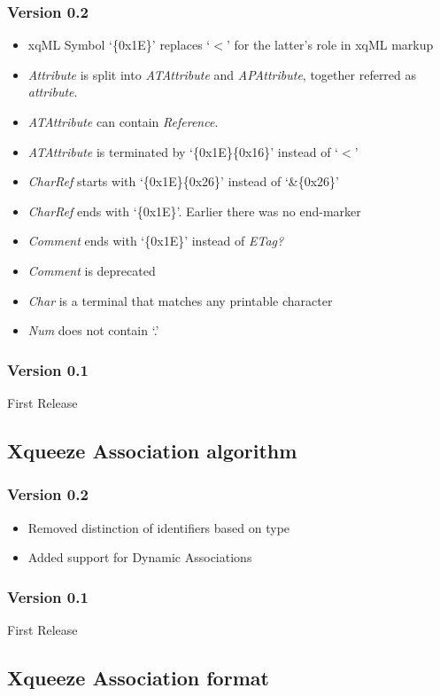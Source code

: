 \documentclass[a4paper]{article}
\begin{document}
\subsubsection{Version 0.2}
\begin{itemize}
\item xqML Symbol `\{0x1E\}' replaces `$<$' for the latter's role in
  xqML markup
\item \textit{Attribute} is split into \textit{ATAttribute} and
  \textit{APAttribute}, together referred as \textit{attribute}.
\item \textit{ATAttribute} can contain \textit{Reference}.
\item \textit{ATAttribute} is terminated by `\{0x1E\}\{0x16\}' instead of
  `$<$'
\item \textit{CharRef} starts with `\{0x1E\}\{0x26\}' instead of
  `\&\{0x26\}'
\item \textit{CharRef} ends with `\{0x1E\}'. Earlier there was no
  end-marker
\item \textit{Comment} ends with `\{0x1E\}' instead of \textit{ETag?}
\item \textit{Comment} is deprecated
\item \textit{Char} is a terminal that matches any printable character
\item \textit{Num} does not contain `.'
\end{itemize}
\subsubsection{Version 0.1}
First Release

\subsection{Xqueeze Association algorithm}
\subsubsection{Version 0.2}
\begin{itemize}
\item Removed distinction of identifiers based on type
\item Added support for Dynamic Associations
\end{itemize}
\subsubsection{Version 0.1}
First Release

\subsection{Xqueeze Association format}
\end{document}
